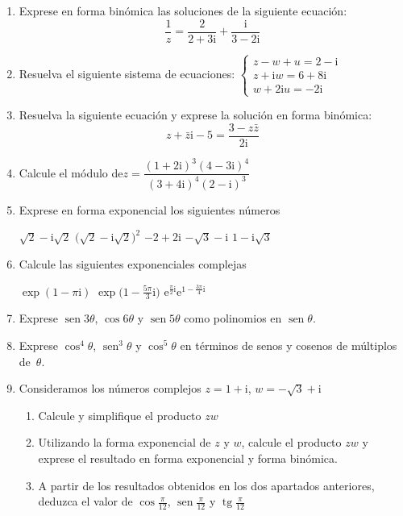 \begin{enumerate}
\item
Exprese en forma binómica las soluciones de la siguiente ecuación:
\[
\dfrac{1}{z}=\dfrac{2}{2+3\mathrm{i}} + \dfrac{\mathrm{i}}{3-2\mathrm{i}}
\]




\item Resuelva el siguiente sistema de ecuaciones: $\left\{\begin{array}{ll}
z-w+u=2-\mathrm{i}\\
z+\mathrm{i} w=6+8\mathrm{i}\\
w+2\mathrm{i} u=-2\mathrm{i}
\end{array}\right.$

\item Resuelva la siguiente ecuación y exprese la solución en forma binómica:
\[
z+\bar{z}\mathrm{i}-5=\dfrac{3-z\bar{z}}{2\mathrm{i}}
\]

\item
Calcule el módulo de\quad $z=\dfrac{(1+2\mathrm{i})^3(4-3\mathrm{i})^4}{(3+4\mathrm{i})^4(2-\mathrm{i})^3}$

\item Exprese en forma exponencial los siguientes números
\setcontadoralph
\begin{centrar}
\nitem
$\sqrt2-\mathrm{i}\sqrt2$\hfill
\nitem
$\big(\sqrt2-\mathrm{i}\sqrt2\big)^2$\hfill
\nitem
$-2+2\mathrm{i}$\hfill
\nitem
$-\sqrt3-\mathrm{i}$\hfill
\nitem
$1-\mathrm{i}\sqrt3$
\end{centrar}


\item
Calcule las siguientes exponenciales complejas
\setcontadoralph
\begin{centrar}
\nitem
$\exp(1-\pi\mathrm{i})$\hfill
\nitem
$\exp\big(1-\frac{5\pi}{3} \mathrm{i}\big)$\hfill
\nitem
$\mbox{e}^{\frac{\pi}{2} \mathrm{i}} \mbox{e}^{1-\frac{3\pi}{4} \mathrm{i}}$
\end{centrar}

\item Exprese $\operatorname{sen} 3\theta$, $\cos 6\theta$ y $\operatorname{sen} 5\theta$ como polinomios en $\operatorname{sen}\theta$.

\item Exprese $\cos^4\theta$, $\operatorname{sen}^3\theta$ y $\cos^5\theta$ en términos de senos y cosenos de múltiplos de~$\theta$.

\item\label{ej:pi12}
Consideramos los números complejos $z=1+\mathrm{i}$, $w=-\sqrt3+\mathrm{i}$
\begin{enumerate}
\item
Calcule y simplifique el producto $zw$
\item
Utilizando la forma exponencial de $z$ y $w$, calcule el producto $zw$ y exprese el resultado en forma exponencial y forma binómica.
\item
A partir de los resultados obtenidos en los dos apartados anteriores, deduzca el valor de $\cos\frac{\pi}{12}$, $\operatorname{sen}\frac{\pi}{12}$ y $\operatorname{tg}\frac{\pi}{12}$
\end{enumerate}


\end{enumerate}
